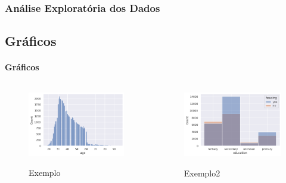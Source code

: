 \documentclass{beamer}
\begin{document}
\begin{frame}
\frametitle{Análise Exploratória dos Dados}
\subsection{Gráficos}
\framesubtitle{Gráficos}
\begin{columns}
    \begin{column}{0.5\textwidth}
        \begin{figure}[h]
            \caption{Exemplo}
            \centering %
            \includegraphics[width=1\textwidth]{IMGS/img1.png}
            \label{figura:distidade}
        \end{figure}
    \end{column}
    \begin{column}{0.5\textwidth}
        \begin{figure}[h]
            \caption{Exemplo2}
            \includegraphics[width=1\textwidth]{IMGS/img2.png}
            \label{figura:fig2}
        \end{figure}
    \end{column}
    \end{columns} 
\end{frame}
\end{document}
